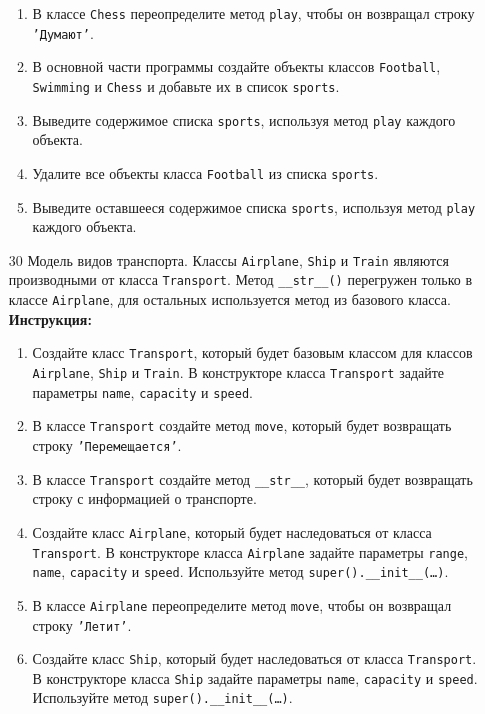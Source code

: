 \begin{enumerate}
\begin{enumerate}
    \item В классе \texttt{Chess} переопределите метод \texttt{play}, чтобы он возвращал строку \texttt{'Думают'}.
    \item В основной части программы создайте объекты классов \texttt{Football}, \texttt{Swimming} и \texttt{Chess} и добавьте их в список \texttt{sports}.
    \item Выведите содержимое списка \texttt{sports}, используя метод \texttt{play} каждого объекта.
    \item Удалите все объекты класса \texttt{Football} из списка \texttt{sports}.
    \item Выведите оставшееся содержимое списка \texttt{sports}, используя метод \texttt{play} каждого объекта.
\end{enumerate}
\item[30]
Модель видов транспорта. Классы \texttt{Airplane}, \texttt{Ship} и \texttt{Train} являются производными от класса \texttt{Transport}. Метод \texttt{\_\_str\_\_()} перегружен только в классе \texttt{Airplane}, для остальных используется метод из базового класса.
\textbf{Инструкция:}
\begin{enumerate}
    \item Создайте класс \texttt{Transport}, который будет базовым классом для классов \texttt{Airplane}, \texttt{Ship} и \texttt{Train}. В конструкторе класса \texttt{Transport} задайте параметры \texttt{name}, \texttt{capacity} и \texttt{speed}.
    \item В классе \texttt{Transport} создайте метод \texttt{move}, который будет возвращать строку \texttt{'Перемещается'}.
    \item В классе \texttt{Transport} создайте метод \texttt{\_\_str\_\_}, который будет возвращать строку с информацией о транспорте.
    \item Создайте класс \texttt{Airplane}, который будет наследоваться от класса \texttt{Transport}. В конструкторе класса \texttt{Airplane} задайте параметры \texttt{range}, \texttt{name}, \texttt{capacity} и \texttt{speed}. Используйте метод \texttt{super().\_\_init\_\_(\ldots)}.
    \item В классе \texttt{Airplane} переопределите метод \texttt{move}, чтобы он возвращал строку \texttt{'Летит'}.
    \item Создайте класс \texttt{Ship}, который будет наследоваться от класса \texttt{Transport}. В конструкторе класса \texttt{Ship} задайте параметры \texttt{name}, \texttt{capacity} и \texttt{speed}. Используйте метод \texttt{super().\_\_init\_\_(\ldots)}.

\end{enumerate}
\end{enumerate}
